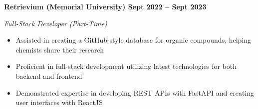 \vspace{0.1cm}
\textbf{Retrievium (Memorial University) \hfill Sept 2022 -- Sept 2023} \par
\textit{Full-Stack Developer (Part-Time)} \par
\begin{itemize}
    \item Assisted in creating a GitHub-style database for organic compounds, helping chemists share their research
    \item Proficient in full-stack development utilizing latest technologies for both backend and frontend
    \item Demonstrated expertise in developing REST APIs with FastAPI and creating user interfaces with ReactJS
\end{itemize} \par